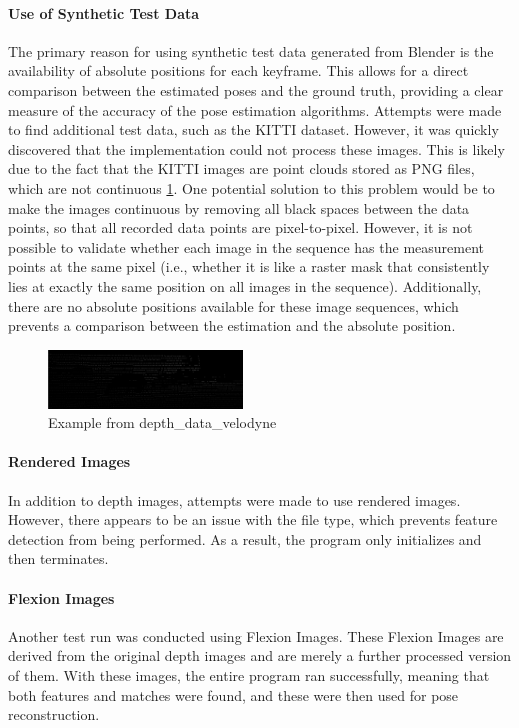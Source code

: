 \documentclass[conference, a4paper]{IEEEtran}
\begin{document}
\paragraph{Use of Synthetic Test Data}
The primary reason for using synthetic test data generated from Blender is the availability of absolute positions for each keyframe. This allows for a direct comparison between the estimated poses and the ground truth, providing a clear measure of the accuracy of the pose estimation algorithms. Attempts were made to find additional test data, such as the KITTI dataset. However, it was quickly discovered that the implementation could not process these images. This is likely due to the fact that the KITTI images are point clouds stored as PNG files, which are not continuous \ref{Pic1}. One potential solution to this problem would be to make the images continuous by removing all black spaces between the data points, so that all recorded data points are pixel-to-pixel. However, it is not possible to validate whether each image in the sequence has the measurement points at the same pixel (i.e., whether it is like a raster mask that consistently lies at exactly the same position on all images in the sequence). Additionally, there are no absolute positions available for these image sequences, which prevents a comparison between the estimation and the absolute position.
\begin{figure}[h]
	\centering
	\includegraphics[width=0.46\textwidth]{pics/kitti_cropped.png}
	\caption{Example from depth\_data\_velodyne\cite{kitti_dataset}}
	\label{Pic1}
\end{figure}

\paragraph{Rendered Images}
In addition to depth images, attempts were made to use rendered images. However, there appears to be an issue with the file type, which prevents feature detection from being performed. As a result, the program only initializes and then terminates.

\paragraph{Flexion Images}
Another test run was conducted using Flexion Images. These Flexion Images are derived from the original depth images and are merely a further processed version of them. With these images, the entire program ran successfully, meaning that both features and matches were found, and these were then used for pose reconstruction.
\end{document}

